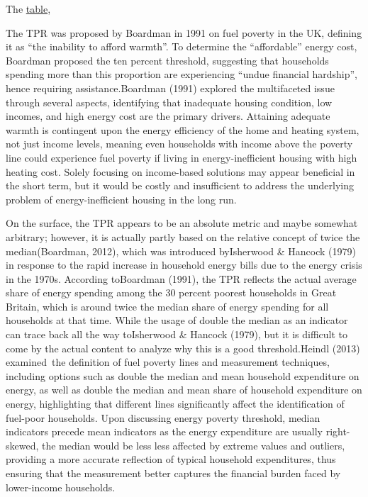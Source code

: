 \documentclass[
  twoside,
  openright,
  degree    = master,               %
  language  = english,              %
  fontset   = overleaf,             %
  watermark = true,                 %
  doi       = true,                 %
]{ntuthesis}
\begin{document}
The \protect\hyperlink{tbl:ep-calculation}{table},

The TPR was proposed by Boardman in 1991 on fuel poverty in the UK,
defining it as ``the inability to afford warmth''. To determine the
``affordable'' energy cost, Boardman proposed the ten percent threshold,
suggesting that households spending more than this proportion are
experiencing ``undue financial hardship'', hence requiring
assistance.Boardman (1991) explored the multifaceted issue through
several aspects, identifying that inadequate housing condition, low
incomes, and high energy cost are the primary drivers. Attaining
adequate warmth is contingent upon the energy efficiency of the home and
heating system, not just income levels, meaning even households with
income above the poverty line could experience fuel poverty if living in
energy-inefficient housing with high heating cost. Solely focusing on
income-based solutions may appear beneficial in the short term, but it
would be costly and insufficient to address the underlying problem of
energy-inefficient housing in the long run.

On the surface, the TPR appears to be an absolute metric and maybe
somewhat arbitrary; however, it is actually partly based on the relative
concept of twice the median(Boardman, 2012), which was introduced
byIsherwood \& Hancock (1979) in response to the rapid increase in
household energy bills due to the energy crisis in the 1970s. According
toBoardman (1991), the TPR reflects the actual average share of energy
spending among the 30 percent poorest households in Great Britain, which
is around twice the median share of energy spending for all households
at that time. While the usage of double the median as an indicator can
trace back all the way toIsherwood \& Hancock (1979), but it is
difficult to come by the actual content to analyze why this is a good
threshold.Heindl (2013) examined~the definition of fuel poverty lines
and measurement techniques, including options such as double the median
and mean household expenditure on energy, as well as double the median
and mean share of household expenditure on energy, highlighting that
different lines significantly affect the identification of fuel-poor
households. Upon discussing energy poverty threshold, median indicators
precede mean indicators as the energy expenditure are usually
right-skewed, the median would be less less affected by extreme values
and outliers, providing a more accurate reflection of typical household
expenditures, thus ensuring that the measurement better captures the
financial burden faced by lower-income households.
\end{document}
